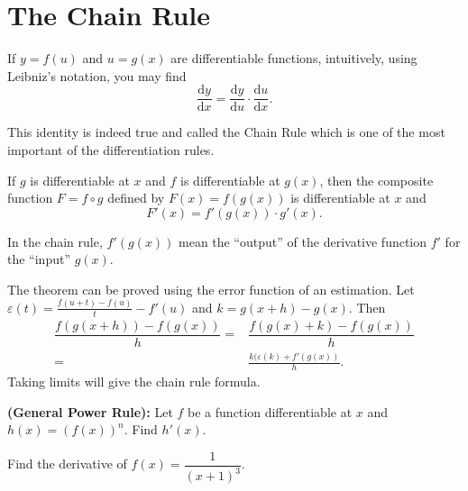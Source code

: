 
\hypertarget{the-chain-rule}{%
\section{The Chain Rule}\label{the-chain-rule}}

If \(y=f(u)\) and \(u=g(x)\) are differentiable functions, intuitively,
using Leibniz's notation, you may find \[
\frac{\mathrm{d} y}{\mathrm{d} x}=\frac{\mathrm{d} y}{\mathrm{d} u}\cdot\frac{\mathrm{d} u}{\mathrm{d} x}.
\]

This identity is indeed true and called the Chain Rule which is one of
the most important of the differentiation rules.

\begin{theorem}

If \(g\) is differentiable at \(x\) and \(f\) is differentiable at
\(g(x)\), then the composite function \(F=f\circ g\) defined by
\(F(x)=f(g(x))\) is differentiable at \(x\) and \[
F'(x)=f'(g(x))\cdot g'(x).
\]

\end{theorem}

In the chain rule, \(f'(g(x))\) mean the ``output'' of the derivative
function \(f'\) for the ``input'' \(g(x)\).

The theorem can be proved using the error function of an estimation. Let
\(\varepsilon(t)=\frac{f(u+t)-f(u)}{t}-f'(u)\) and \(k=g(x+h)-g(x)\).
Then \[
\begin{aligned}
  \dfrac{f(g(x+h))-f(g(x))}{h}
  =&\dfrac{f(g(x)+k)-f(g(x))}{h}\\
  =&\frac{k(\varepsilon(k)+f'(g(x))}{h}.
\end{aligned}
\] Taking limits will give the chain rule formula.

\begin{example}

\textbf{(General Power Rule):} Let \(f\) be a function differentiable at
\(x\) and \(h(x)=(f(x))^n\). Find \(h'(x)\).

\end{example}
\vspace*{6\baselineskip}

\begin{example}

Find the derivative of \(f(x)=\dfrac{1}{(x+1)^3}\).

\end{example}
\vspace*{6\baselineskip}

